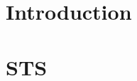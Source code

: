 

\begin{abstract}

\end{abstract}

\begin{frontmatter}

\tableofcontents



\end{frontmatter}

\chapter{Introduction}
\label{sec:intro}


\chapter{STS}
\label{sec:sts}



%

%


\printbibliography


